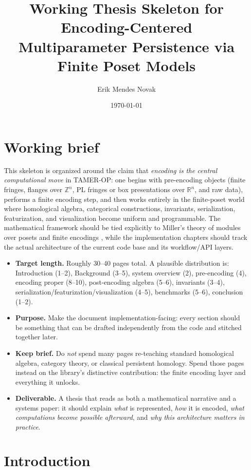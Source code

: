 \documentclass[11pt]{article}
\title{Working Thesis Skeleton for \TAMER\\
\large Encoding-Centered Multiparameter Persistence via Finite Poset Models}
\author{Erik Mendes Novak}
\date{\today}
\newcommand{\R}{\mathbb{R}}
\newcommand{\Z}{\mathbb{Z}}
\newcommand{\TAMER}{\textsc{TAMER-OP}}
\newenvironment{plan}{\begin{itemize}[leftmargin=1.6em,itemsep=0.35em,topsep=0.25em]}{\end{itemize}}
\newcommand{\target}[1]{\item \textbf{Target length.} #1}
\newcommand{\purpose}[1]{\item \textbf{Purpose.} #1}
\newcommand{\keepbrief}[1]{\item \textbf{Keep brief.} #1}
\newcommand{\deliverable}[1]{\item \textbf{Deliverable.} #1}
\begin{document}
\maketitle
\tableofcontents

\section*{Working brief}

This skeleton is organized around the claim that \emph{encoding is the central computational move} in \TAMER: one begins with pre-encoding objects (finite fringes, flanges over $\Z^n$, PL fringes or box presentations over $\R^n$, and raw data), performs a finite encoding step, and then works entirely in the finite-poset world where homological algebra, categorical constructions, invariants, serialization, featurization, and visualization become uniform and programmable. The mathematical framework should be tied explicitly to Miller's theory of modules over posets and finite encodings \cite{Mil20}, while the implementation chapters should track the actual architecture of the current code base and its workflow/API layers.

\begin{plan}
    \target{Roughly 30--40 pages total. A plausible distribution is: Introduction (1--2), Background (3--5), system overview (2), pre-encoding (4), encoding proper (8--10), post-encoding algebra (5--6), invariants (3--4), serialization/featurization/visualization (4--5), benchmarks (5--6), conclusion (1--2).}
    \purpose{Make the document implementation-facing: every section should be something that can be drafted independently from the code and stitched together later.}
    \keepbrief{Do \emph{not} spend many pages re-teaching standard homological algebra, category theory, or classical persistent homology. Spend those pages instead on the library's distinctive contribution: the finite encoding layer and everything it unlocks.}
    \deliverable{A thesis that reads as both a mathematical narrative and a systems paper: it should explain \emph{what} is represented, \emph{how} it is encoded, \emph{what computations become possible afterward}, and \emph{why this architecture matters in practice}.}
\end{plan}

\section{Introduction}\label{sec:introduction}
\end{document}
